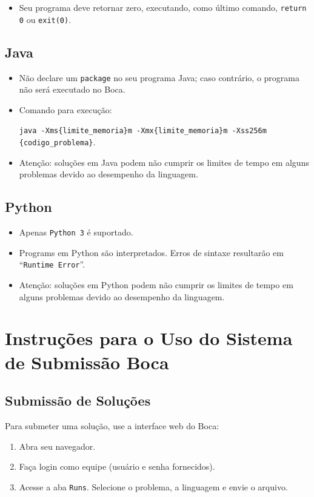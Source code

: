 \documentclass{article}
\begin{document}
\begin{titlepage}
\begin{itemize}
    \item Seu programa deve retornar zero, executando, como último comando, \texttt{return 0} ou \texttt{exit(0)}.
\end{itemize}

\subsection{Java}

\begin{itemize}
    \item Não declare um \texttt{package} no seu programa Java; caso contrário, o programa não será executado no Boca.
    \item Comando para execução:

	\texttt{java -Xms\{limite\_memoria\}m -Xmx\{limite\_memoria\}m -Xss256m \{codigo\_problema\}}.
    \item Atenção: soluções em Java podem não cumprir os limites de tempo em alguns problemas devido ao desempenho da linguagem.
\end{itemize}

\subsection{Python}

\begin{itemize}
    \item Apenas \texttt{Python 3} é suportado.
	\item Programs em Python são interpretados. Erros de sintaxe resultarão em ``\texttt{Runtime Error}''.
    \item Atenção: soluções em Python podem não cumprir os limites de tempo em alguns problemas devido ao desempenho da linguagem.
\end{itemize}

\section{Instruções para o Uso do Sistema de Submissão Boca}

\subsection{Submissão de Soluções}

Para submeter uma solução, use a interface web do Boca:
\begin{enumerate}
    \item Abra seu navegador.
    \item Faça login como equipe (usuário e senha fornecidos).
    \item Acesse a aba \texttt{Runs}. Selecione o problema, a linguagem e envie o arquivo.
\end{enumerate}


\end{titlepage}
\end{document}
